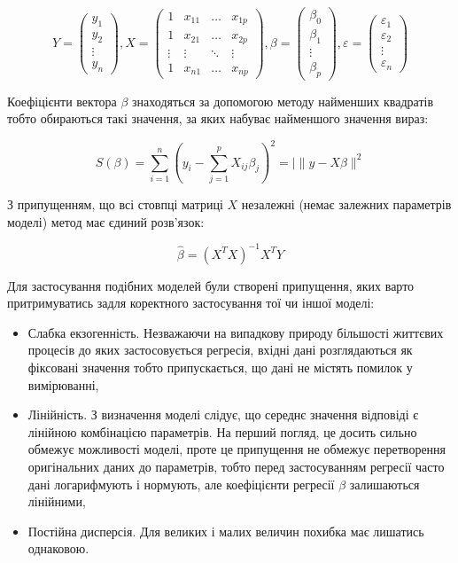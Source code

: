 $$
Y = \begin{pmatrix}
        y_1 \\
        y_2 \\
        \vdots \\
        y_n
    \end{pmatrix}, 
X = \begin{pmatrix}
        1 & x_{1 1} & \dots & x_{1 p}\\
        1 & x_{2 1} & \dots & x_{2 p}\\
        \vdots & \vdots & \ddots & \vdots \\
        1 & x_{n 1} & \dots & x_{n p}
    \end{pmatrix}, 
\beta = \begin{pmatrix}
            \beta_0 \\
            \beta_1 \\ 
            \vdots \\
            \beta_p
        \end{pmatrix}, 
\varepsilon =   \begin{pmatrix}
                    \varepsilon_1 \\
                    \varepsilon_2 \\
                    \vdots \\
                    \varepsilon_n 
                \end{pmatrix}
$$

Коефіцієнти вектора $\beta$ знаходяться за допомогою методу найменших квадратів тобто обираються такі значення, за яких набуває найменшого значення вираз: 

$$ S(\beta) = \sum_{i = 1}^{n} ( y_i - \sum_{j = 1}^{p} X_{ij} \beta_j )^2 = |\| y - X\beta \|^2 $$

З припущенням, що всі стовпці матриці $X$ незалежні (немає залежних параметрів моделі) метод має єдиний розв'язок:

$$\hat{\beta} = (X^T X)^{-1} X^T Y$$

Для застосування подібних моделей були створені припущення, яких варто притримуватись задля коректного застосування тої чи іншої моделі:

\begin{itemize}
    \item Слабка екзогенність. Незважаючи на випадкову природу більшості життєвих процесів до яких застосовується регресія, вхідні дані розглядаються як фіксовані значення тобто припускається, що дані не містять помилок у вимірюванні,

    \item Лінійність. З визначення моделі слідує, що середнє значення відповіді є лінійною комбінацією параметрів. На перший погляд, це досить сильно обмежує можливості моделі, проте це припущення не обмежує перетворення оригінальних даних до параметрів, тобто перед застосуванням регресії часто дані логарифмують і нормують, але коефіцієнти регресії $\beta$ залишаються лінійними,

    \item  Постійна дисперсія. Для великих і малих величин похибка має лишатись однаковою.
\end{itemize}

